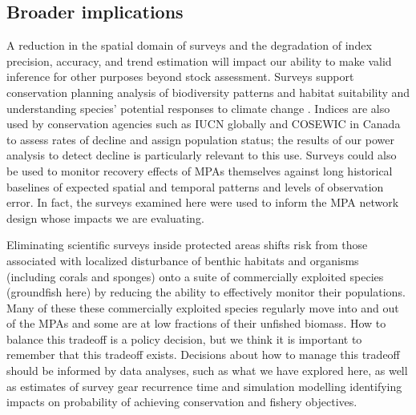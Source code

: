 \documentclass[12pt]{article}
\begin{document}
\subsection*{Broader implications}

A reduction in the spatial domain of surveys and the degradation of index precision, accuracy, and trend estimation will impact our ability to make valid inference for other purposes beyond stock assessment.
Surveys support conservation planning analysis of biodiversity patterns and habitat suitability \citep[e.g.,][]{rubidge2016, thompson2022meps} and understanding species' potential responses to climate change \citep[e.g.,][]{english2021, thompson2023warming}.
Indices are also used by conservation agencies such as IUCN globally \citep{iucn2012} and COSEWIC in Canada \citep{cosewicTable2} to assess rates of decline and assign population status; the results of our power analysis to detect decline is particularly relevant to this use.
Surveys could also be used to monitor recovery effects of MPAs themselves against long historical baselines of expected spatial and temporal patterns and levels of observation error.
In fact, the surveys examined here were used to inform the MPA network design whose impacts we are evaluating.



Eliminating scientific surveys inside protected areas shifts risk from those associated with localized disturbance of benthic habitats and organisms (including corals and sponges) onto a suite of commercially exploited species (groundfish here) by reducing the ability to effectively monitor their populations.
Many of these these commercially exploited species regularly move into and out of the MPAs and some are at low fractions of their unfished biomass.
How to balance this tradeoff is a policy decision, but we think it is important to remember that this tradeoff exists.
Decisions about how to manage this tradeoff should be informed by data analyses, such as what we have explored here, as well as estimates of survey gear recurrence time \citep{benoit2020national} and simulation modelling identifying impacts on probability of achieving conservation and fishery objectives.
\end{document}
